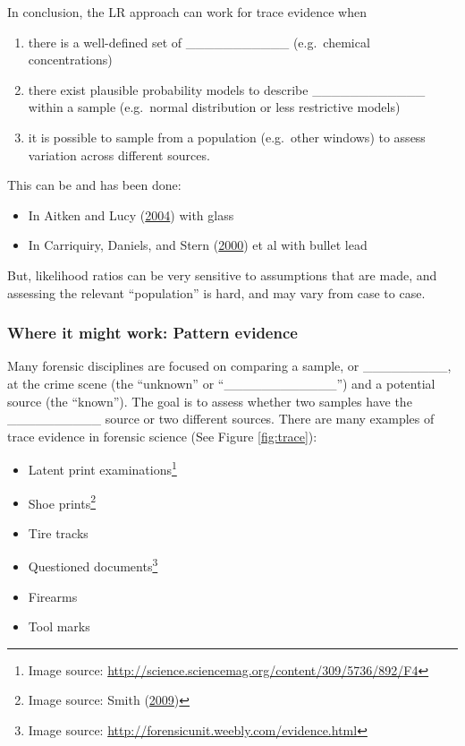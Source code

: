 \documentclass[]{book}
\providecommand{\tightlist}{%
  \setlength{\itemsep}{0pt}\setlength{\parskip}{0pt}}
\let\rmarkdownfootnote\footnote%
\def\footnote{\protect\rmarkdownfootnote}
\theoremstyle{definition}
\theoremstyle{definition}
\theoremstyle{remark}
\begin{document}
In conclusion, the LR approach can work for trace evidence when

\begin{enumerate}
\def\labelenumi{\arabic{enumi}.}
\tightlist
\item
  there is a well-defined set of \_\_\_\_\_\_\_\_\_\_\_ (e.g.~chemical
  concentrations)\vspace{.1in}
\item
  there exist plausible probability models to describe
  \_\_\_\_\_\_\_\_\_\_\_\_ within a sample (e.g.~normal distribution or
  less restrictive models)\vspace{.1in}
\item
  it is possible to sample from a population (e.g.~other windows) to
  assess variation across different sources.
\end{enumerate}

This can be and has been done:

\begin{itemize}
\tightlist
\item
  In Aitken and Lucy (\protect\hyperlink{ref-aitkenlucy}{2004}) with
  glass
\item
  In Carriquiry, Daniels, and Stern
  (\protect\hyperlink{ref-aliciaetal}{2000}) et al with bullet lead
\end{itemize}

But, likelihood ratios can be very sensitive to assumptions that are
made, and assessing the relevant ``population'' is hard, and may vary
from case to case.

\subsubsection{Where it might work: Pattern
evidence}\label{where-it-might-work-pattern-evidence}

Many forensic disciplines are focused on comparing a sample, or
\_\_\_\_\_\_\_\_\_, at the crime scene (the ``unknown'' or
``\_\_\_\_\_\_\_\_\_\_\_\_'') and a potential source (the ``known'').
The goal is to assess whether two samples have the \_\_\_\_\_\_\_\_\_\_
source or two different sources. There are many examples of trace
evidence in forensic science (See Figure \ref{fig:trace}):

\begin{itemize}
\tightlist
\item
  Latent print examinations\footnote{Image source:
    \url{http://science.sciencemag.org/content/309/5736/892/F4}}
\item
  Shoe prints\footnote{Image source: Smith
    (\protect\hyperlink{ref-shoepic}{2009})}
\item
  Tire tracks
\item
  Questioned documents\footnote{Image source:
    \url{http://forensicunit.weebly.com/evidence.html}}
\item
  Firearms
\item
  Tool marks
\end{itemize}
\end{document}
